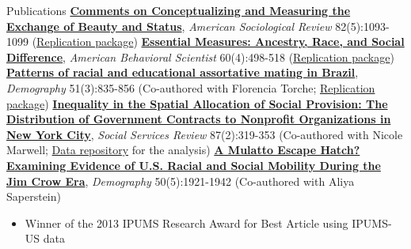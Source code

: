 \begin{rubric}{Publications}
\entry*[2017] \textbf{\href{https://osf.io/preprints/socarxiv/5ydxd/}{Comments on Conceptualizing and Measuring the Exchange of Beauty and Status}}, \emph{American Sociological Review} 82(5):1093-1099 (\href{https://github.com/AaronGullickson/beautyexchange}{Replication package}) 
\entry*[2016] \textbf{\href{http://abs.sagepub.com/content/60/4/498}{Essential Measures: Ancestry, Race, and Social Difference}}, \emph{American Behavioral Scientist} 60(4):498-518 (\href{https://github.com/AaronGullickson/essentialmeasures}{Replication package}) 
\entry*[2014] \textbf{\href{http://link.springer.com/article/10.1007/s13524-014-0300-2}{Patterns of racial and educational assortative mating in Brazil}}, \emph{Demography} 51(3):835-856 (Co-authored with Florencia Torche; \href{https://github.com/AaronGullickson/brazil_intermar}{Replication package}) 
\entry*[2013] \textbf{\href{https://www.researchgate.net/publication/259726465_Inequality_in_the_Spatial_Allocation_of_Social_Services_Government_Contracts_to_Nonprofit_Organizations_in_New_York_City}{Inequality in the Spatial Allocation of Social Provision: The Distribution of Government Contracts to Nonprofit Organizations in New York City}}, \emph{Social Services Review} 87(2):319-353 (Co-authored with Nicole Marwell; \href{https://github.com/AaronGullickson/nyc_contracts}{Data repository} for the analysis) 
\entry*[2013] \textbf{\href{http://link.springer.com/article/10.1007\%2Fs13524-013-0210-8}{A Mulatto Escape Hatch? Examining Evidence of U.S. Racial and Social Mobility During the Jim Crow Era}}, \emph{Demography} 50(5):1921-1942 (Co-authored with Aliya Saperstein) \begin{itemize}
\item Winner of the 2013 IPUMS Research Award for Best Article using IPUMS-US data


\end{itemize}
\end{rubric}
